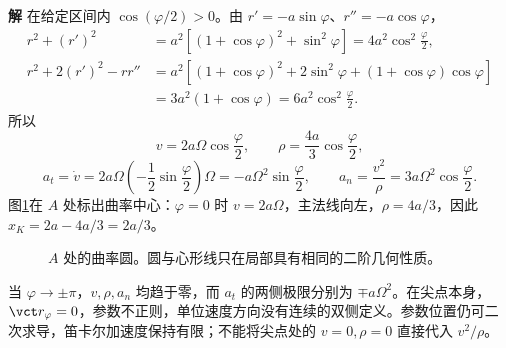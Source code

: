 \documentclass[11pt,openany,fontset=fandol]{ctexbook}
\theoremstyle{definition}\newtheorem{example}{例}[chapter]\newtheorem{exercise}{习题}[chapter]
\newcommand{\SolutionStart}{\par\medskip\ifdim\pagetotal>0pt\ifdim\dimexpr\pagegoal-\pagetotal\relax<3\baselineskip\newpage\fi\fi\noindent\textbf{解}\quad\ignorespaces}
\newenvironment{solution}{\SolutionStart}{\par\medskip}
\begin{document}
\begin{solution}
在给定区间内 $\cos(\varphi/2)>0$。由 $r'=-a\sin\varphi$、$r''=-a\cos\varphi$，
\[
\begin{aligned}
r^2+(r')^2
&=a^2[(1+\cos\varphi)^2+\sin^2\varphi]
=4a^2\cos^2\frac\varphi2,\\
r^2+2(r')^2-rr''
&=a^2[(1+\cos\varphi)^2+2\sin^2\varphi
+(1+\cos\varphi)\cos\varphi]\\
&=3a^2(1+\cos\varphi)=6a^2\cos^2\frac\varphi2.
\end{aligned}
\]
所以
\[
v=2a\Omega\cos\frac\varphi2,\qquad
\rho=\frac{4a}{3}\cos\frac\varphi2,
\]
\[
a_t=\dot v=2a\Omega\left(-\frac12\sin\frac\varphi2\right)\Omega
=-a\Omega^2\sin\frac\varphi2,\qquad
a_n=\frac{v^2}{\rho}=3a\Omega^2\cos\frac\varphi2.
\]
图\ref{mp3:fig:l3-p2-s}在 $A$ 处标出曲率中心：$\varphi=0$ 时 $v=2a\Omega$，主法线向左，$\rho=4a/3$，因此 $x_K=2a-4a/3=2a/3$。

\begin{figure}[H]\centering
{}
\caption{$A$ 处的曲率圆。圆与心形线只在局部具有相同的二阶几何性质。}\label{mp3:fig:l3-p2-s}
\end{figure}


当 $\varphi\to\pm\pi$，$v,\rho,a_n$ 均趋于零，而 $a_t$ 的两侧极限分别为 $\mp a\Omega^2$。在尖点本身，$\vct r_\varphi=0$，参数不正则，单位速度方向没有连续的双侧定义。参数位置仍可二次求导，笛卡尔加速度保持有限；不能将尖点处的 $v=0,\rho=0$ 直接代入 $v^2/\rho$。

\end{solution}
\end{document}
